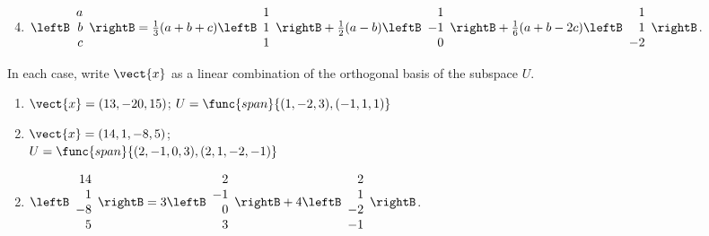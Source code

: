 \begin{multicols}{2}
\begin{ex}
\begin{sol}
\begin{enumerate}[label={\alph*.}]
\setcounter{enumi}{3}
\item  
$\leftB \begin{array}{r}
a\\
b\\
c
\end{array} \rightB
= \frac{1}{3}(a + b + c)
\leftB \begin{array}{r}
1\\
1\\
1
\end{array} \rightB
+ \frac{1}{2}(a - b)
\leftB \begin{array}{r}
1\\
-1\\
0
\end{array} \rightB
+ \frac{1}{6}(a + b - 2c)
\leftB \begin{array}{r}
1\\
1\\
-2
\end{array} \rightB$.

\end{enumerate}
\end{sol}
\end{ex}

\begin{ex}
In each case, write $\vect{x}$ as a linear combination of the orthogonal basis of the subspace $U$.

\begin{enumerate}[label={\alph*.}]
\item $\vect{x} = (13, -20, 15)$; $U = \func{span}\{(1, -2, 3), (-1, 1, 1)\}$

\item $\vect{x} = (14, 1, -8, 5)$; \\ $U = \func{span}\{(2, -1, 0, 3), (2, 1, -2, -1)\}$

\end{enumerate}
\begin{sol}
\begin{enumerate}[label={\alph*.}]
\setcounter{enumi}{1}
\item  
$\leftB \begin{array}{r}
14\\
1\\
-8\\
5
\end{array} \rightB = 3
\leftB \begin{array}{r}
2\\
-1\\
0\\
3
\end{array} \rightB + 4
\leftB \begin{array}{r}
2\\
1\\
-2\\
-1
\end{array} \rightB$.


\end{enumerate}
\end{sol}
\end{ex}
\end{multicols}
